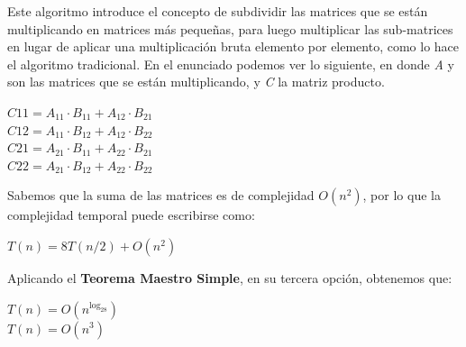 \documentclass[12pt]{report}
\begin{document}
  \begin{center}
  \end{center}

  Este algoritmo introduce el concepto de subdividir las matrices que se están multiplicando en matrices más pequeñas, para luego multiplicar las sub-matrices en lugar de aplicar una multiplicación bruta elemento por elemento, como lo hace el algoritmo tradicional. En el enunciado podemos ver lo siguiente, en donde \textit{A} y  son las matrices que se están multiplicando, y \textit{C} la matriz producto.

  \begin{center}
    $ C11 = A_{11} \cdot B_{11} + A_{12} \cdot B_{21} $\\
    $ C12 = A_{11} \cdot B_{12} + A_{12} \cdot B_{22}$\\
    $ C21 = A_{21} \cdot B_{11} + A_{22} \cdot B_{21} $\\
    $ C22 = A_{21} \cdot B_{12} + A_{22} \cdot B_{22} $\\
  \end{center}

  Sabemos que la suma de las matrices es de complejidad $O(n^2)$, por lo que la complejidad temporal puede escribirse como:

  \begin{center}
    $ T(n) = 8T(n/2) + O(n^2) $
  \end{center}

  Aplicando el \textbf{Teorema Maestro Simple}, en su tercera opción, obtenemos que:

  \begin{center}
    $ T(n) = O(n^{\log_28}) $ \\
    $ T(n) = O(n^3) $
  \end{center}
\end{document}
